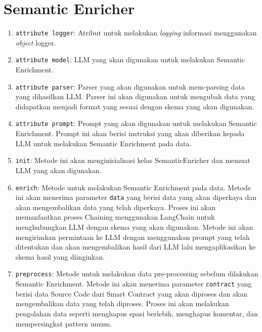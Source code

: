 \chapter{Semantic Enricher}
\label{appendix:semantic-enricher}

\begin{enumerate}
	\item \texttt{attribute logger}: Atribut untuk melakukan \textit{logging} informasi menggunakan \textit{object} logger.
	\item \texttt{attribute model}: LLM yang akan digunakan untuk melakukan Semantic Enrichment.
	\item \texttt{attribute parser}: Parser yang akan digunakan untuk mem-parsing data yang dihasilkan LLM. Parser ini akan digunakan untuk mengubah data yang didapatkan menjadi format yang sesuai dengan skema yang akan digunakan.
	\item \texttt{attribute prompt}: Prompt yang akan digunakan untuk melakukan Semantic Enrichment. Prompt ini akan berisi instruksi yang akan diberikan kepada LLM untuk melakukan Semantic Enrichment pada data.
	\item \texttt{\textunderscore\textunderscore init\textunderscore\textunderscore}: Metode ini akan menginisialisasi kelas SemanticEnricher dan memuat LLM yang akan digunakan.
	\item \texttt{enrich}: Metode untuk melakukan Semantic Enrichment pada data. Metode ini akan menerima parameter \texttt{data} yang berisi data yang akan diperkaya dan akan mengembalikan data yang telah diperkaya. Proses ini akan memanfaatkan proses Chaining menggunakan LangChain untuk menghubungkan LLM dengan skema yang akan digunakan. Metode ini akan mengirimkan permintaan ke LLM dengan menggunakan prompt yang telah ditentukan dan akan mengembalikan hasil dari LLM lalu mengaplikasikan ke skema hasil yang diinginkan.
	\item \texttt{preprocess}: Metode untuk melakukan data pre-processing sebelum dilakukan Semantic Enrichment. Metode ini akan menerima parameter \texttt{contract} yang berisi data Source Code dari Smart Contract yang akan diproses dan akan mengembalikan data yang telah diproses. Proses ini akan melakukan pengolahan data seperti menghapus spasi berlebih, menghapus komentar, dan mempersingkat pattern umum.
\end{enumerate}